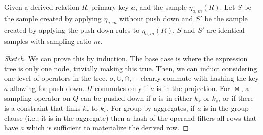 \begin{theorem}
Given a derived relation $R$, primary key $a$, and the sample $\eta_{a, m}(R)$.
Let $S$ be the sample created by applying $\eta_{a, m}$ without push down and 
$S'$ be the sample created by applying the push down rules to $\eta_{a, m}(R)$.
$S$ and $S'$ are identical samples with sampling ratio $m$.
\end{theorem}
\begin{proof}[Sketch]
We can prove this by induction.
The base case is where the expression tree is only one node, trivially making this true.
Then, we can induct considering one level of operators in the tree.
$\sigma, \cup, \cap, -$ clearly commute with hashing the key $a$ allowing for push down.
$\Pi$ commutes only if $a$ is in the projection.
For $\bowtie$, a sampling operator on $Q$ can be pushed down if $a$ is in either $k_r$ or $k_s$, or if there is a constraint that links $k_r$ to $k_s$.
For group by aggregates, if $a$ is in the group clause (i.e., it is in the aggregate) then a hash of the operand filters all rows that have $a$ which is sufficient to materialize the derived row.
\end{proof} 

































































 


